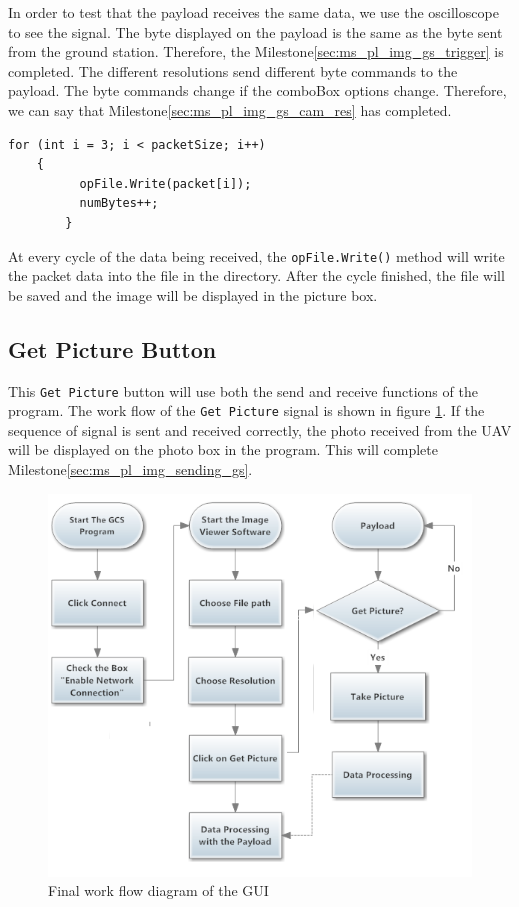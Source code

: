 In order to test that the payload receives the same data, we use the oscilloscope to see the signal. The byte displayed on the payload is the same as the byte sent from the ground station. Therefore, the Milestone\ref{sec:ms_pl_img_gs_trigger} is completed. The different resolutions send different byte commands to the payload. The byte commands change if the comboBox options change. Therefore, we can say that Milestone\ref{sec:ms_pl_img_gs_cam_res} has completed.

\begin{lstlisting}[caption={writing binary file},label=lst:writingb]          
	for (int i = 3; i < packetSize; i++)
	{
          opFile.Write(packet[i]);
          numBytes++;
    	}
\end{lstlisting}         

At every cycle of the data being received, the \texttt{opFile.Write()} method will write the packet data into the file in the directory. After the cycle finished, the file will be saved and the image will be displayed in the picture box. 

\subsection{Get Picture Button}
This \texttt{Get Picture} button will use both the send and receive functions of the program. 
The work flow of the \texttt{Get Picture} signal is shown in figure \ref{GUI_finalWorkFlow}.
If the sequence of signal is sent and received correctly, the photo received from the UAV will be displayed on the photo box in the program.
This will complete Milestone\ref{sec:ms_pl_img_sending_gs}.

\begin{figure}[H]
\begin{center}
\includegraphics[scale=1]{figures/finalWorkFlow.png} 
\end{center}
\caption{Final work flow diagram of the GUI\label{GUI_finalWorkFlow}}
\end{figure}

